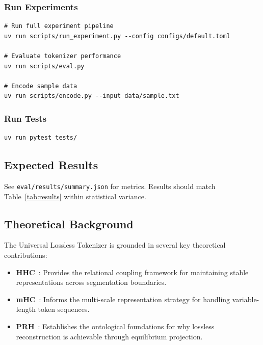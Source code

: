 \subsubsection*{Run Experiments}
\begin{verbatim}
# Run full experiment pipeline
uv run scripts/run_experiment.py --config configs/default.toml

# Evaluate tokenizer performance
uv run scripts/eval.py

# Encode sample data
uv run scripts/encode.py --input data/sample.txt
\end{verbatim}

\subsubsection*{Run Tests}
\begin{verbatim}
uv run pytest tests/
\end{verbatim}

\subsection*{Expected Results}
See \texttt{eval/results/summary.json} for metrics. Results should match
Table~\ref{tab:results} within statistical variance.

\subsection*{Theoretical Background}
The Universal Lossless Tokenizer is grounded in several key theoretical contributions:
\begin{itemize}
  \item \textbf{HHC}~\cite{miller2026hhc}: Provides the relational coupling framework
        for maintaining stable representations across segmentation boundaries.
  \item \textbf{mHC}~\cite{deepseek2024mhc}: Informs the multi-scale representation
        strategy for handling variable-length token sequences.
  \item \textbf{PRH}~\cite{miller2024prh}: Establishes the ontological foundations
        for why lossless reconstruction is achievable through equilibrium projection.
\end{itemize}
